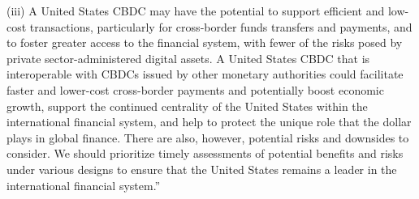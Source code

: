 \begin{itemize}
{(iii)  A United States CBDC may have the potential to support efficient and low-cost transactions, particularly for cross‑border funds transfers and payments, and to foster greater access to the financial system, with fewer of the risks posed by private sector-administered digital assets.  A United States CBDC that is interoperable with CBDCs issued by other monetary authorities could facilitate faster and lower-cost cross-border payments and potentially boost economic growth, support the continued centrality of the United States within the international financial system, and help to protect the unique role that the dollar plays in global finance.  There are also, however, potential risks and downsides to consider.  We should prioritize timely assessments of potential benefits and risks under various designs to ensure that the United States remains a leader in the international financial system.''}\par


\end{itemize}

